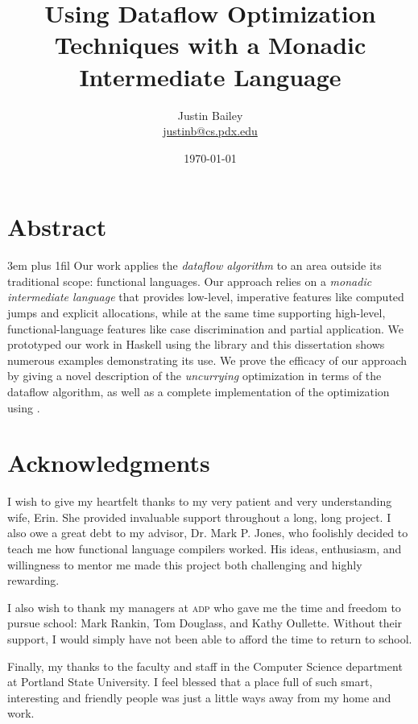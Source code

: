 \dodocclass



\date{\today}
\author{Justin Bailey \\ \url{justinb@cs.pdx.edu}}
\title{Using Dataflow Optimization Techniques with a Monadic Intermediate Language}
\maketitle 

\pagestyle{plain}
\section*{Abstract}
{%
\parfillskip 3em plus 1fil%
Our work applies the \emph{dataflow algorithm} to an area outside its
traditional scope: functional languages. Our approach relies on
a \emph{monadic intermediate language} that provides low-level,
imperative features like computed jumps and explicit allocations,
while at the same time supporting high-level, functional-language
features like case discrimination and partial application. We
prototyped our work in Haskell using the \hoopl library and this
dissertation shows numerous examples demonstrating its use. We prove
the efficacy of our approach by giving a novel description of
the \emph{uncurrying} optimization in terms of the dataflow algorithm, as
well as a complete implementation of the optimization using \hoopl.\par}
\newpage

\section*{Acknowledgments}
I wish to give my heartfelt thanks to my very patient and very understanding
wife, Erin. She provided invaluable support throughout a long, long
project. I also owe a great debt to my advisor, Dr. Mark P. Jones, who
foolishly decided to teach me how functional language compilers
worked. His ideas, enthusiasm, and willingness to mentor me made this
project both challenging and highly rewarding. 

I also wish to thank my managers at \textsc{adp} who gave me the time
and freedom to pursue school: Mark Rankin, Tom Douglass, and Kathy
Oullette. Without their support, I would simply have not been able to
afford the time to return to school.

Finally, my thanks to the faculty and staff in the Computer Science
department at Portland State University. I feel blessed that a 
place full of such smart, interesting and friendly people was just
a little ways away from my home and work.

\newpage

\singlespacing
\tableofcontents
\newpage
{}
\listoffigures
\newpage

